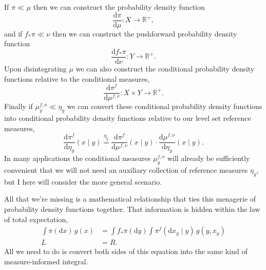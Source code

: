 \documentclass[
  letterpaper,
  DIV=11,
  numbers=noendperiod]{scrartcl}
\begin{document}
If \(\pi \ll \mu\) then we can construct the probability density
function \[
\frac{ \mathrm{d}  \pi }{ \mathrm{d}  \mu  } : X \rightarrow \mathbb{R}^{+},
\] and if \(f_{*} \pi \ll \nu\) then we can construct the pushforward
probability density function \[
\frac{ \mathrm{d}  f_{*} \pi }{ \mathrm{d}  \nu  } : Y \rightarrow \mathbb{R}^{+}.
\] Upon disintegrating \(\mu\) we can also construct the conditional
probability density functions relative to the conditional measures, \[
\frac{ \mathrm{d}  \pi^{f} }{ \mathrm{d}  \mu^{f, \nu}  }
: X \times Y \rightarrow \mathbb{R}^{+}.
\] Finally if \(\mu^{f, \nu}_{y} \ll \eta_{y}\) we can convert these
conditional probability density functions into conditional probability
density functions relative to our level set reference measures, \[
\frac{ \mathrm{d}  \pi^{f} }{ \mathrm{d}  \eta_{y}  } (x \mid y)
\overset{ \eta_{y} }{=}
\frac{ \mathrm{d}  \pi^{f} }{ \mathrm{d}  \mu^{f, \nu}  } (x \mid y)
\cdot
\frac{ \mathrm{d}  \mu^{f, \nu} }{ \mathrm{d}  \eta_{y}  } (x \mid y).
\] In many applications the conditional measures \(\mu^{f, \nu}_{y}\)
will already be sufficiently convenient that we will not need an
auxiliary collection of reference measures \(\eta_{y}\), but I here will
consider the more general scenario.

All that we're missing is a mathematical relationship that ties this
menagerie of probability density functions together. That information is
hidden within the law of total expectation, \begin{align*}
\int \pi( \mathrm{d} x ) \, g(x)
&=
\int f_{*} \pi (\mathrm{d} y)
\int \pi^{f}( \mathrm{d}x_y \mid y ) \, g(y, x_{y})
\\
L
&=
R.
\end{align*} All we need to do is convert both sides of this equation
into the same kind of measure-informed integral.
\end{document}
